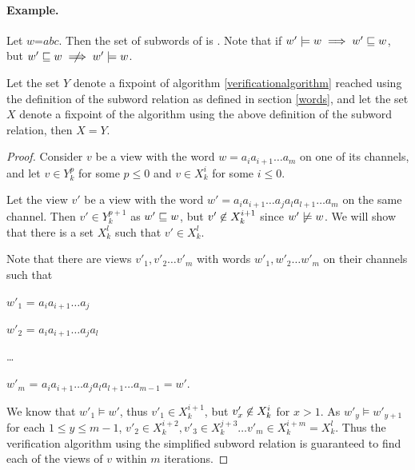 \paragraph{Example.} Let $w$=$abc$. Then the set of subwords of  is . Note that if $w' \models w \implies w' \sqsubseteq w$, but $w' \subword w \centernot\implies w' \models w$. 

\begin{lemma}
Let the set $Y$ denote a fixpoint of algorithm \ref{verificationalgorithm} reached using the definition of the subword relation as defined in section \ref{words}, and let the set $X$ denote a fixpoint of the algorithm using the above definition of the subword relation, then $X=Y$.
\end{lemma}
\begin{proof}
Consider $v$ be a view with the word $w = a_ia_{i+1}\ldots a_m$ on one of its channels, and let $v\in Y_k^p$ for some $p \leq 0$ and $v\in X_k^i$ for some $i \leq 0$.

Let the view $v'$ be a view with the word $w' = a_ia_{i+1}\ldots a_ja_la_{l+1}\ldots a_m$ on the same channel. Then $v' \in Y_k^{p+1}$ as $w' \sqsubseteq w$, but $v' \centernot\in X_k^{i+1}$ since $w' \centernot\models w$. We will show that there is a set $X_k^l$ such that $v'\in X_k^l$.


Note that there are views $v'_1, v'_2\ldots v'_m$ with words $w'_1, w'_2\ldots w'_m$ on their channels such that

\hspace{10mm}
$w'_1$ =  $a_ia_{i+1}\ldots a_j$

\hspace{10mm}
$w'_2$ = $a_ia_{i+1}\ldots a_ja_l$

\hspace{10mm}
\ldots

\hspace{10mm}
$w'_{m}$ = $a_ia_{i+1}\ldots a_ja_la_{l+1}\ldots a_{m-1} = w'$.

We know that $w'_1 \models w'$, thus $v'_1 \in X_k^{i+1}$, but $v'_x \centernot\in X_k^i$ for $x > 1$. As $w'_y \models w'_{y+1}$ for each $1 \leq y \leq m-1$, $v'_2 \in X_k^{i+2}, v'_3 \in X_k^{j+3} \ldots v'_m \in X_k^{i+m} = X_k^l$. Thus the verification algorithm using the simplified subword relation is guaranteed to find each of the views of $v$ within $m$ iterations.

\end{proof}


